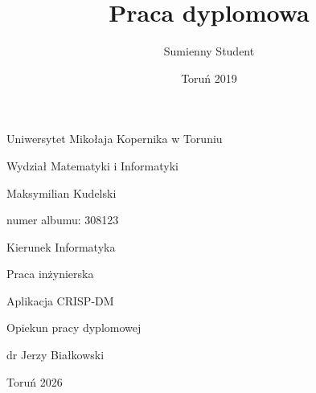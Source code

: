 \documentclass[12pt]{book}
\title{Praca dyplomowa}
\author{Sumienny Student}
\date{Toruń 2019}
\begin{document}
\begin{titlepage}


\begin{center}

\Large
Uniwersytet Mikołaja Kopernika w Toruniu

Wydział Matematyki i Informatyki

%

\vspace*{2.5cm}

\LARGE
Maksymilian Kudelski

\large
numer albumu:
308123

Kierunek Informatyka


\vspace*{2cm}

\LARGE
Praca inżynierska

\medskip

Aplikacja CRISP-DM

\end{center}

\vspace*{2.5cm}


\hspace*{.45\columnwidth}
\begin{minipage}{.45\columnwidth}
\large
Opiekun pracy dyplomowej 

dr Jerzy Białkowski
\end{minipage}


\vfill

\begin{center}

\large
Toruń 2026

\end{center}


\end{titlepage}
\end{document}
